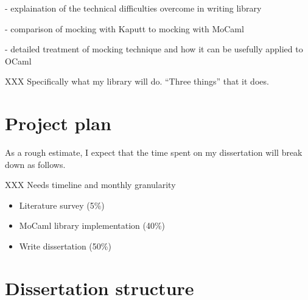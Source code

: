 \documentclass[proposal]{softeng}
\begin{document}
- explaination of the technical difficulties overcome in writing library

- comparison of mocking with Kaputt to mocking with MoCaml

- detailed treatment of mocking technique and how it can be usefully applied to OCaml

XXX Specifically what my library will do. ``Three things'' that it does.

\section{Project plan}


As a rough estimate, I expect that the time spent on my dissertation
will break down as follows.

XXX Needs timeline and monthly granularity

\begin{itemize}
  \item Literature survey (5\%)
  \item MoCaml library implementation (40\%)
  \item Write dissertation (50\%)
\end{itemize}

\section{Dissertation structure}

\end{document}
